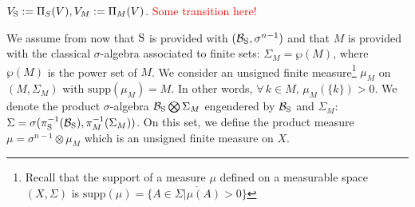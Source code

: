$V_{\text{S}}:=\Pi_S(V), V_M:=\Pi_M(V)$.
\textcolor{red}{Some transition here!}

We assume from now that $\text{S}$ is provided with $(\mathcal{B}_{\text{S}},\sigma^{n-1})$ and that $M$ is provided with the classical $\sigma$-algebra associated to finite sets: $\Sigma_M = \wp(M)$, where $\wp(M)$ is the power set of $M$. We consider an unsigned finite measure\footnote{Recall that the support of a measure $\mu$ defined on a measurable space $(X, \Sigma)$ is $\text{supp}(\mu) = \overline{\{A \in \Sigma | \mu(A) > 0 \}}$} $\mu_M$ on $(M, \Sigma_M)$ with $\text{supp} (\mu_M) = M$. In other words, $\forall\,k \in M$, $\mu_M(\{k\})  > 0$. We denote the product $\sigma$-algebra $\mathcal{B}_{\text{S}} \bigotimes \Sigma_M$ engendered by $\mathcal{B}_{\text{S}}$ and $\Sigma_M$: $\Sigma = \sigma( \pi_{\text{S}}^{-1}(\mathcal{B}_{\text{S}}),  \pi_{M}^{-1}(\Sigma_M))$. On this set, we define the product measure $\mu = \sigma^{n-1} \otimes \mu_M$ which is an unsigned finite measure on $X$.